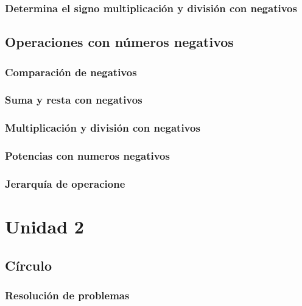 \documentclass[12pt,repaso,answers]{RDS_unit}
\begin{document}
\begin{questions}
	\subsubsection{Determina el signo multiplicación y división con negativos}
	\question[1]{}

	\subsection   {Operaciones con números negativos}
	\subsubsection{Comparación de negativos}
	\question[1]{}
	\subsubsection{Suma y resta con negativos}
	\question[1]{}
	\subsubsection{Multiplicación y división con negativos}
	\question[1]{}
	\subsubsection{Potencias con numeros negativos}
	\question[1]{}
	\subsubsection{Jerarquía de operacione}
	\question[1]{}

	\section{Unidad 2}
	\subsection   {Círculo}
	\subsubsection{Resolución de problemas}
	\question[1]{}

\end{questions}
\end{document}
